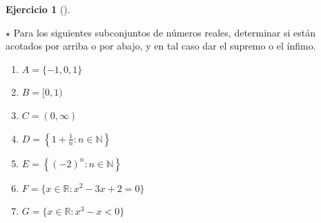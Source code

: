 \documentclass[
  a4paper,
]{scrreport}
\providecommand{\tightlist}{%
  \setlength{\itemsep}{0pt}\setlength{\parskip}{0pt}}\usepackage{longtable,booktabs,array}
\theoremstyle{definition}
\newtheorem{exercise}{Ejercicio}[chapter]
\theoremstyle{remark}
\begin{document}
\begin{tcolorbox}
\begin{tcolorbox}
\begin{tcolorbox}
\begin{tcolorbox}
\begin{tcolorbox}
\begin{tcolorbox}
\begin{tcolorbox}
\begin{tcolorbox}
\begin{tcolorbox}
\begin{tcolorbox}
\begin{tcolorbox}
\begin{tcolorbox}
\begin{tcolorbox}
\begin{tcolorbox}
\begin{tcolorbox}
\begin{tcolorbox}
\begin{tcolorbox}
\begin{tcolorbox}
\begin{tcolorbox}
\begin{tcolorbox}
\begin{tcolorbox}
\begin{tcolorbox}
\begin{tcolorbox}
\begin{tcolorbox}
\begin{tcolorbox}
\begin{tcolorbox}
\begin{tcolorbox}
\begin{tcolorbox}
\begin{tcolorbox}
\begin{tcolorbox}
\begin{tcolorbox}
\begin{tcolorbox}
\begin{tcolorbox}
\begin{tcolorbox}
\begin{tcolorbox}
\begin{tcolorbox}
\begin{tcolorbox}
\begin{tcolorbox}
\begin{tcolorbox}
\begin{tcolorbox}
\begin{tcolorbox}
\begin{tcolorbox}
\begin{tcolorbox}
\begin{tcolorbox}
\begin{tcolorbox}
\begin{tcolorbox}
\begin{tcolorbox}
\begin{tcolorbox}
\begin{exercise}[]\protect\hypertarget{exr-supremos-infimos-reales}{}\label{exr-supremos-infimos-reales}

\(\star\) Para los siguientes subconjuntos de números reales, determinar
si están acotados por arriba o por abajo, y en tal caso dar el supremo o
el ínfimo.

\begin{enumerate}
\def\labelenumi{\alph{enumi}.}
\tightlist
\item
  \(A = \{-1,0,1\}\)
\item
  \(B= [0,1)\)
\item
  \(C= (0,\infty)\)
\item
  \(D= \left\{1+\frac{1}{n}:n\in\mathbb{N}\right\}\)
\item
  \(E= \left\{(-2)^n:n\in\mathbb{N}\right\}\)
\item
  \(F= \{x\in\mathbb{R}:x^2-3x+2=0\}\)
\item
  \(G= \{x\in\mathbb{R}:x^3-x<0\}\)
\end{enumerate}

\end{exercise}


\end{tcolorbox}
\end{tcolorbox}
\end{tcolorbox}
\end{tcolorbox}
\end{tcolorbox}
\end{tcolorbox}
\end{tcolorbox}
\end{tcolorbox}
\end{tcolorbox}
\end{tcolorbox}
\end{tcolorbox}
\end{tcolorbox}
\end{tcolorbox}
\end{tcolorbox}
\end{tcolorbox}
\end{tcolorbox}
\end{tcolorbox}
\end{tcolorbox}
\end{tcolorbox}
\end{tcolorbox}
\end{tcolorbox}
\end{tcolorbox}
\end{tcolorbox}
\end{tcolorbox}
\end{tcolorbox}
\end{tcolorbox}
\end{tcolorbox}
\end{tcolorbox}
\end{tcolorbox}
\end{tcolorbox}
\end{tcolorbox}
\end{tcolorbox}
\end{tcolorbox}
\end{tcolorbox}
\end{tcolorbox}
\end{tcolorbox}
\end{tcolorbox}
\end{tcolorbox}
\end{tcolorbox}
\end{tcolorbox}
\end{tcolorbox}
\end{tcolorbox}
\end{tcolorbox}
\end{tcolorbox}
\end{tcolorbox}
\end{tcolorbox}
\end{tcolorbox}
\end{tcolorbox}
\end{document}
